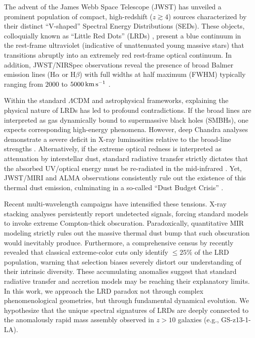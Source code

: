 \documentclass[twocolumn]{aastex631}
\begin{document}
The advent of the James Webb Space Telescope (JWST) has unveiled a prominent population of compact, high-redshift ($z \gtrsim 4$) sources characterized by their distinct ``V-shaped'' Spectral Energy Distributions (SEDs). These objects, colloquially known as ``Little Red Dots'' (LRDs) \citep[e.g.,][]{Labbe2023, Matthee2024, Greene2024}, present a blue continuum in the rest-frame ultraviolet (indicative of unattenuated young massive stars) that transitions abruptly into an extremely red rest-frame optical continuum. In addition, JWST/NIRSpec observations reveal the presence of broad Balmer emission lines (H$\alpha$ or H$\beta$) with full widths at half maximum (FWHM) typically ranging from $2000$ to $5000 \rm\, km\, s^{-1}$ \citep{Harikane2023, Maiolino2023b, Furtak2023}. 

Within the standard $\Lambda$CDM and astrophysical frameworks, explaining the physical nature of LRDs has led to profound contradictions. If the broad lines are interpreted as gas dynamically bound to supermassive black holes (SMBHs), one expects corresponding high-energy phenomena. However, deep Chandra analyses demonstrate a severe deficit in X-ray luminosities relative to the broad-line strengths \citep{Yue2024, Maiolino2024}. Alternatively, if the extreme optical redness is interpreted as attenuation by interstellar dust, standard radiative transfer strictly dictates that the absorbed UV/optical energy must be re-radiated in the mid-infrared \citep{Chen2025}. Yet, JWST/MIRI and ALMA observations consistently rule out the existence of this thermal dust emission, culminating in a so-called ``Dust Budget Crisis'' \citep{PerezGonzalez2024, Witstok2024, Smail2024}.

Recent multi-wavelength campaigns have intensified these tensions. X-ray stacking analyses \citep[e.g.,][]{Yue2024, Maiolino2024} persistently report undetected signals, forcing standard models to invoke extreme Compton-thick obscuration. Paradoxically, quantitative MIR modeling \citep{Casey2024} strictly rules out the massive thermal dust bump that such obscuration would inevitably produce. Furthermore, a comprehensive census by \citet{Rinaldi2026} recently revealed that classical extreme-color cuts only identify $\le 25\%$ of the LRD population, warning that selection biases severely distort our understanding of their intrinsic diversity. These accumulating anomalies suggest that standard radiative transfer and accretion models may be reaching their explanatory limits. In this work, we approach the LRD paradox not through complex phenomenological geometries, but through fundamental dynamical evolution. We hypothesize that the unique spectral signatures of LRDs are deeply connected to the anomalously rapid mass assembly observed in $z > 10$ galaxies (e.g., GS-z13-1-LA).
\end{document}
